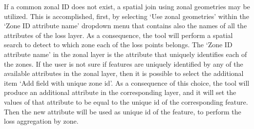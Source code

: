 If a common zonal ID does not exist, a spatial join using zonal geometries may
be utilized. This is accomplished, first, by selecting `Use zonal geometries'
within the `Zone ID attribute name' dropdown menu that contains also the names
of all the attributes of the loss layer. As a consequence, the tool will
perform a spatial search to detect to which zone each of the loss points
belongs. The `Zone ID attribute name' in the zonal layer is the attribute that
uniquely identifies each of the zones. If the user is not sure if features are
uniquely identified by any of the available attributes in the zonal layer, then
it is possible to select the additional item `Add field with unique zone id'.
As a consequence of this choice, the tool will produce an additional attribute
in the corresponding layer, and it will set the values of that attribute to be
equal to the unique id of the corresponding feature. Then the new attribute
will be used as unique id of the feature, to perform the loss aggregation by
zone.
